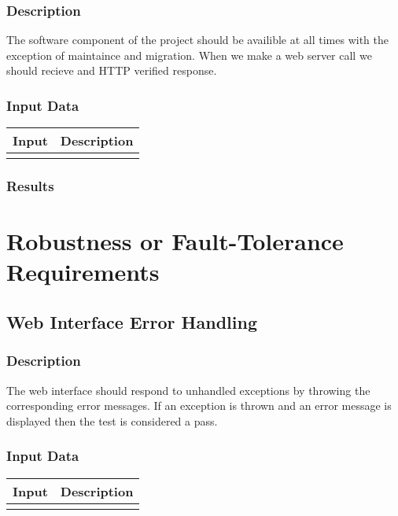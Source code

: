 \documentclass{scrreprt}
\begin{document}
\subsubsection{Description}
\begin{flushleft}
The software component of the project should be availible at all times with the exception of maintaince and migration. When we make a web server call we should recieve and HTTP verified response.
\end{flushleft}
\subsubsection{Input Data}
 \centering
 \begin{tabular}{p{3cm}p{6cm}}
 \hline\hline
 Input & Description\\
 \hline\hline
   &  \\ %
 \hline
 \end{tabular}
\subsubsection{Results}

\section{Robustness or Fault-Tolerance Requirements}
\subsection{Web Interface Error Handling}
\subsubsection{Description}
\begin{flushleft}
The web interface should respond to unhandled exceptions by throwing the corresponding error messages. If an exception is thrown and an error message is displayed then the test is considered a pass.
\end{flushleft}
\subsubsection{Input Data}
 \centering
 \begin{tabular}{p{3cm}p{6cm}}
 \hline\hline
 Input & Description\\
 \hline\hline
   &  \\ %
 \hline
 \end{tabular}
\end{document}
